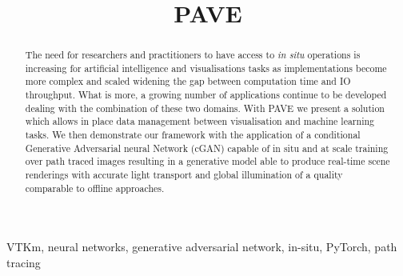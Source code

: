 \documentclass[conference]{IEEEtran}
\begin{document}
\title{PAVE\\
}

\author{
\and
{}
\and
{}
}

\maketitle

\begin{abstract}
    The need for researchers and practitioners to have access to {\it in situ} operations is increasing for artificial intelligence and visualisations tasks as implementations become more complex and scaled widening the gap between computation time and IO throughput. What is more, a growing number of applications continue to be developed dealing with the combination of these two domains. With PAVE we present a solution which allows in place data management between visualisation and machine learning tasks. We then demonstrate our framework with the application of a conditional Generative Adversarial neural Network (cGAN) capable of in situ and at scale training over path traced images resulting in a generative model able to produce real-time scene renderings with accurate light transport and global illumination of a quality comparable to offline approaches. 
    
\end{abstract}

\begin{IEEEkeywords}
    VTKm, neural networks, generative adversarial network, in-situ, PyTorch, path tracing
\end{IEEEkeywords}


  
\end{document}

